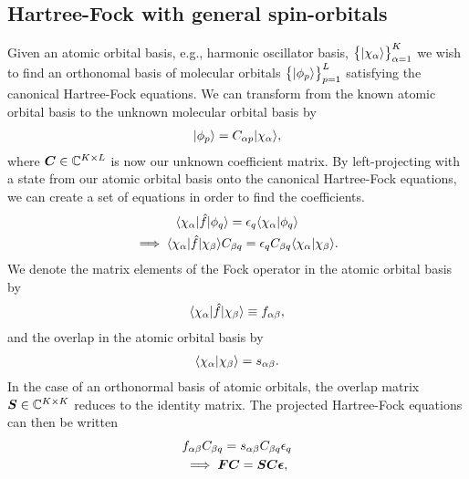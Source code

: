         \subsection{Hartree-Fock with general spin-orbitals}
            Given an atomic orbital basis, e.g., harmonic oscillator basis,
            $\left\{ | \chi_{\alpha} \rangle \right\}_{\alpha = 1}^{K}$ we wish to find an
            orthonomal basis of molecular orbitals $\left\{ | \phi_{p} \rangle \right\}_{p =
            1}^{L}$ satisfying the canonical Hartree-Fock equations.
            We can transform from the known atomic orbital basis to the unknown
            molecular orbital basis by
            \begin{align}
                | \phi_p \rangle = C_{\alpha p}| \chi_{\alpha} \rangle,
            \end{align}
            where $\boldsymbol{C} \in \mathbb{C}^{K\times L}$ is now our unknown
            coefficient matrix.
            By left-projecting with a state from our atomic orbital basis onto
            the canonical Hartree-Fock equations, we can create a set of
            equations in order to find the coefficients.
            \begin{gather}
                \langle \chi_{\alpha} |\hat{f}| \phi_q \rangle
                = \epsilon_{q} \langle \chi_{\alpha} | \phi_q \rangle
                \\
                \implies
                \langle \chi_{\alpha} |\hat{f}| \chi_{\beta} \rangle C_{\beta q}
                = \epsilon_q C_{\beta q} \langle \chi_{\alpha} | \chi_{\beta} \rangle.
            \end{gather}
            We denote the matrix elements of the Fock operator in the atomic
            orbital basis by
            \begin{align}
                \langle \chi_{\alpha} |\hat{f}| \chi_{\beta} \rangle
                \equiv f_{\alpha \beta},
            \end{align}
            and the overlap in the atomic orbital basis by
            \begin{align}
                \langle \chi_{\alpha} | \chi_{\beta} \rangle = s_{\alpha\beta}.
            \end{align}
            In the case of an orthonormal basis of atomic orbitals, the overlap
            matrix $\boldsymbol{S} \in \mathbb{C}^{K \times K}$ reduces to the identity
            matrix.
            The projected Hartree-Fock equations can then be written
            \begin{gather}
                f_{\alpha\beta} C_{\beta q}
                = s_{\alpha \beta} C_{\beta q} \epsilon_{q}
                \\
                \implies
                \boldsymbol{F} \boldsymbol{C} = \boldsymbol{S} \boldsymbol{C} \boldsymbol{\epsilon},
                \label{eq:roothan-hall-general}
            \end{gather}

